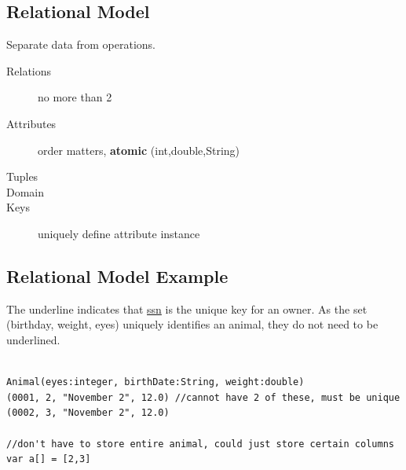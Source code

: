\documentclass{article}
\begin{document}
\subsection{Relational Model}
Separate data from operations.

\begin{description}
    \item[Relations] {no more than 2}
    \item[Attributes] { order matters, \textbf{atomic} (int,double,String) }
    \item[Tuples]
    \item[Domain]
    \item[Keys] uniquely define attribute instance
\end{description}

\subsection{Relational Model Example}

\begin{figure}[h!]
\end{figure}
The underline indicates that \underline{ssn} is the unique key for an owner. As
the set (birthday, weight, eyes) uniquely identifies an animal, they do not need
to be underlined.

\begin{lstlisting}

Animal(eyes:integer, birthDate:String, weight:double)
(0001, 2, "November 2", 12.0) //cannot have 2 of these, must be unique
(0002, 3, "November 2", 12.0)

//don't have to store entire animal, could just store certain columns
var a[] = [2,3]  
\end{lstlisting}
\end{document}
